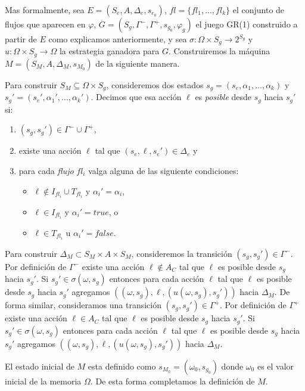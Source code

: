 Mas formalmente, sea $E = (S_e,A,\Delta_e,s_{e_0})$, $fl = \{fl_1,...,fl_k\}$ el conjunto de flujos que aparecen en
$\varphi$, $G = (S_g,\Gamma^-,\Gamma^+,s_{g_0},\varphi_g)$ el juego GR(1) construido a partir de $E$ como explicamos
anteriormente, y sea $\sigma: \Omega \times S_g \rightarrow 2^{S_g}$ y $u: \Omega \times S_g \rightarrow \Omega$ la
estrategia ganadora para $G$. Construiremos la máquina $M = (S_M, A, \Delta_M, s_{M_0})$ de la siguiente manera.

Para construir $S_M \subseteq \Omega \times S_g$, consideremos dos estados $s_g = (s_e,\alpha_1,...,\alpha_k)$ y $s_g' =
(s_e',\alpha_1',...,\alpha_k')$. Decimos que esa acción $\ell$ es \emph{posible} desde $s_g$ hacia $s_g'$ si:

\begin{enumerate}
\itemsep-4mm
\item $(s_g,s_g') \in \Gamma^- \cup \Gamma^+$,
\item existe una acción $\ell$ tal que $(s_e,\ell,s_e') \in \Delta_e$ y
\item para cada \emph{flujo} $fl_i$ valga alguna de las siguiente condiciones:
\vspace{-4mm}
\begin{itemize}
    \itemsep-4mm
    \item $\ell \notin I_{fl_i} \cup T_{fl_i}$ y $\alpha_i' = \alpha_i$,
    \item $\ell \in I_{fl_i}$ y $\alpha_i'=true$, o
    \item $\ell \in T_{fl_i}$ u $\alpha_i'=false$.
\end{itemize}
\end{enumerate}

Para construir $\Delta_M \subset S_M \times A \times S_M$, consideremos la transición $(s_g,s_g') \in \Gamma^-$. Por
definición de $\Gamma^-$ existe una acción $\ell \notin A_C$ tal que $\ell$ es posible desde $s_g$ hacia $s_g'$. Si
$s_g' \in \sigma(\omega,s_g)$ entonces para cada acción $\ell$ tal que $\ell$ es posible desde $s_g$ hacia $s_g'$
agregamos $((\omega,s_g),\ell,(u(\omega,s_g),s_g'))$ hacia $\Delta_M$. De forma similar, consideramos una transición
$(s_g,s_g') \in \Gamma^+$. Por definición de $\Gamma^+$ existe una acción $\ell \in A_C$ tal que $\ell$ es posible desde
$s_g$ hacia $s_g'$. Si $s_g' \in \sigma(\omega,s_g)$ entonces para cada acción $\ell$ tal que $\ell$ es posible desde
$s_g$ hacia $s_g'$ agregamos $((\omega,s_g),\ell,(u(\omega,s_g),s_g'))$ hacia $\Delta_M$.

El estado inicial de $M$ esta definido como $s_{M_0} = (\omega_0,s_{g_0})$ donde $\omega_0$ es el valor inicial de la
memoria $\Omega$. De esta forma completamos la definición de $M$.

